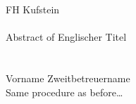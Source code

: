 
FH Kufstein \\
\getStudiengang \\
Abstract of \getThesis\xspace Englischer Titel  \\
\getAutor \\
\getBetreuer \\
Vorname Zweitbetreuername \\


Same procedure as before\ldots









\endgroup

